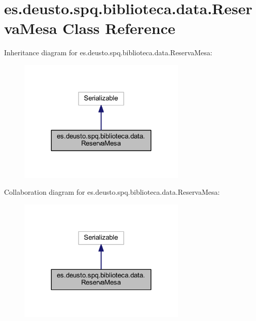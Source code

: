 \hypertarget{classes_1_1deusto_1_1spq_1_1biblioteca_1_1data_1_1_reserva_mesa}{}\section{es.\+deusto.\+spq.\+biblioteca.\+data.\+Reserva\+Mesa Class Reference}
\label{classes_1_1deusto_1_1spq_1_1biblioteca_1_1data_1_1_reserva_mesa}


Inheritance diagram for es.\+deusto.\+spq.\+biblioteca.\+data.\+Reserva\+Mesa\+:
\nopagebreak
\begin{figure}[H]
\begin{center}
\leavevmode
\includegraphics[width=227pt]{classes_1_1deusto_1_1spq_1_1biblioteca_1_1data_1_1_reserva_mesa__inherit__graph}
\end{center}
\end{figure}


Collaboration diagram for es.\+deusto.\+spq.\+biblioteca.\+data.\+Reserva\+Mesa\+:
\nopagebreak
\begin{figure}[H]
\begin{center}
\leavevmode
\includegraphics[width=227pt]{classes_1_1deusto_1_1spq_1_1biblioteca_1_1data_1_1_reserva_mesa__coll__graph}
\end{center}
\end{figure}
